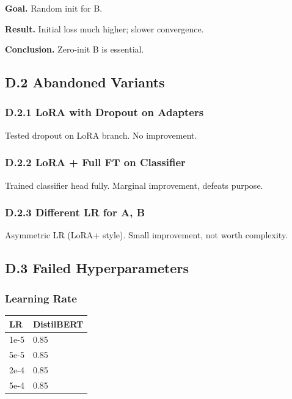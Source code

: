 \textbf{Goal.} Random init for B.

\textbf{Result.} Initial loss much higher; slower convergence.

\textbf{Conclusion.} Zero-init B is essential.

\subsection{D.2 Abandoned Variants}

\subsubsection{D.2.1 LoRA with Dropout on Adapters}

Tested dropout on LoRA branch. No improvement.

\subsubsection{D.2.2 LoRA + Full FT on Classifier}

Trained classifier head fully. Marginal improvement, defeats purpose.

\subsubsection{D.2.3 Different LR for A, B}

Asymmetric LR (LoRA+ style). Small improvement, not worth complexity.

\subsection{D.3 Failed Hyperparameters}

\subsubsection{Learning Rate}

\begin{table}[H]
\centering
\small
\begin{tabular}{ll}
\toprule
\textbf{LR} & \textbf{DistilBERT} \\
\midrule
1e-5 & 0.85 \\
5e-5 & 0.85 \\
2e-4 & 0.85 \\
5e-4 & 0.85 \\
\bottomrule
\end{tabular}
\end{table}


